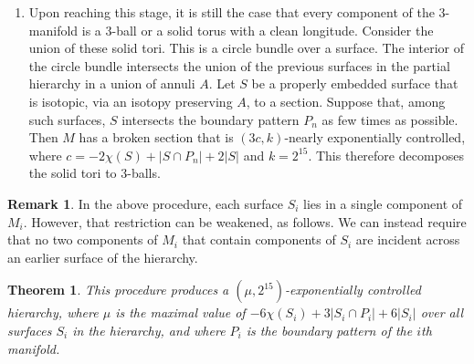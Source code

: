 \documentclass[oneside]{amsart}
\numberwithin{equation}{section}
\theoremstyle{plain}
\newtheorem{theorem}[equation]{Theorem}
\theoremstyle{definition}
\newtheorem{remark}[equation]{Remark}
\begin{document}
\begin{enumerate}
\begin{enumerate}[(i)]
for this solid torus that intersects the pattern as few times as possible.
\item If two solid tori have a component of intersection that is a disc, then cut along a parallel copy of this disc lying in one of
the solid tori.
\end{enumerate}
\item Upon reaching this stage, it is still the case that
every component of the 3-manifold is a 3-ball or a solid torus with a clean longitude.
Consider the union of these solid tori. This is a circle bundle over a surface. The interior of the circle
bundle intersects the union of the previous surfaces in the partial hierarchy in a union of annuli $A$. 
Let $S$ be a properly embedded surface that is isotopic, via an isotopy preserving $A$, to a section.
Suppose that, among such surfaces, $S$ intersects the boundary pattern $P_n$ as few times as possible.
Then $M$ has a broken section that is $(3c,k)$-nearly exponentially controlled, where $c = -2\chi(S) +  |S \cap P_n| + 2|S|$ and $k = 2^{15}$.
This therefore decomposes the solid tori to 3-balls.
\end{enumerate}

\begin{remark} 
\label{Rem:MultipleComponents}
In the above procedure, each surface $S_i$ lies in a single component of $M_i$. However, that restriction can be weakened,
as follows. We can instead require that no two components of $M_i$ that contain components of $S_i$ are incident across an
earlier surface of the hierarchy.
\end{remark}

\begin{theorem}
\label{Thm:ProducesWeaklyFundamentalHierarchy}
This procedure produces a $(\mu,2^{15})$-exponentially controlled hierarchy, where $\mu$ is the maximal value of
$-6\chi(S_i) + 3|S_i \cap P_i| + 6 |S_i|$ over all surfaces $S_i$ in the hierarchy, and where $P_i$ is the boundary
pattern of the $i$th manifold.
\end{theorem}
\end{document}
